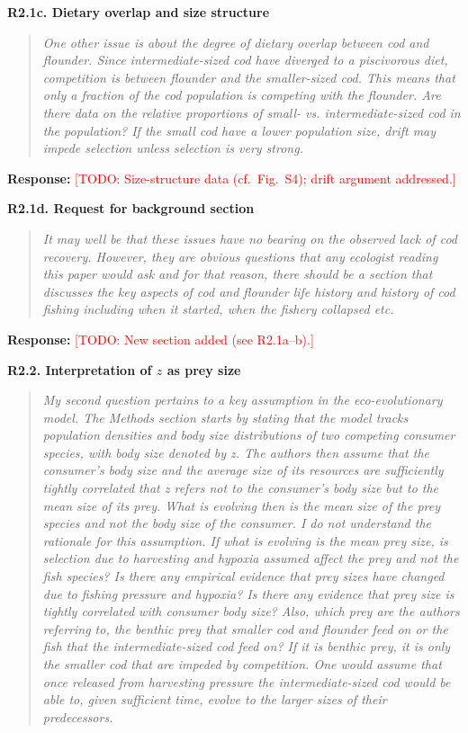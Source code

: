 \documentclass[11pt]{article}
\newenvironment{revcomment}[1]
  {\par\medskip\noindent\textbf{#1}\par\begin{quote}\itshape\color{commentgrey}}
  {\end{quote}}
\newcommand{\response}{\par\noindent\textbf{Response:} }
\newcommand{\todo}[1]{\textcolor{red}{[TODO: #1]}}
\begin{document}
\begin{revcomment}{R2.1c. Dietary overlap and size structure}
One other issue is about the degree of dietary overlap between cod and flounder. Since intermediate-sized cod have diverged to a piscivorous diet, competition is between flounder and the smaller-sized cod. This means that only a fraction of the cod population is competing with the flounder. Are there data on the relative proportions of small- vs. intermediate-sized cod in the population? If the small cod have a lower population size, drift may impede selection unless selection is very strong.
\end{revcomment}

\response \todo{Size-structure data (cf.\ Fig.~S4); drift argument addressed.}

\begin{revcomment}{R2.1d. Request for background section}
It may well be that these issues have no bearing on the observed lack of cod recovery. However, they are obvious questions that any ecologist reading this paper would ask and for that reason, there should be a section that discusses the key aspects of cod and flounder life history and history of cod fishing including when it started, when the fishery collapsed etc.
\end{revcomment}

\response \todo{New section added (see R2.1a--b).}

\begin{revcomment}{R2.2. Interpretation of $z$ as prey size}
My second question pertains to a key assumption in the eco-evolutionary model. The Methods section starts by stating that the model tracks population densities and body size distributions of two competing consumer species, with body size denoted by z. The authors then assume that the consumer's body size and the average size of its resources are sufficiently tightly correlated that z refers not to the consumer's body size but to the mean size of its prey. What is evolving then is the mean size of the prey species and not the body size of the consumer. I do not understand the rationale for this assumption. If what is evolving is the mean prey size, is selection due to harvesting and hypoxia assumed affect the prey and not the fish species? Is there any empirical evidence that prey sizes have changed due to fishing pressure and hypoxia? Is there any evidence that prey size is tightly correlated with consumer body size? Also, which prey are the authors referring to, the benthic prey that smaller cod and flounder feed on or the fish that the intermediate-sized cod feed on? If it is benthic prey, it is only the smaller cod that are impeded by competition. One would assume that once released from harvesting pressure the intermediate-sized cod would be able to, given sufficient time, evolve to the larger sizes of their predecessors.
\end{revcomment}
\end{document}
